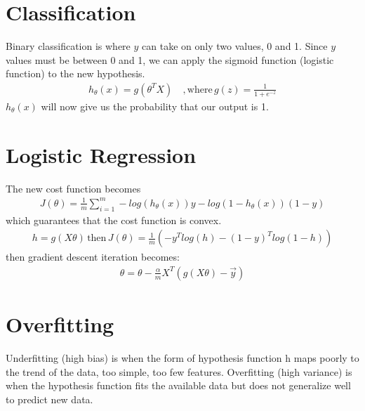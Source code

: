 \documentclass[12pt]{article}
\begin{document}
\section{Classification}
Binary classification is where $y$ can take on only two values, 0 and 1. Since $y$ values must be between 0 and 1, we can apply the sigmoid function (logistic function) to the new hypothesis.
\begin{align*}
    h_\theta (x)=g(\theta^TX)\ & ,\text{where}\, g(z) = \frac{1}{1+e^{-z}}
\end{align*}
$h_\theta (x)$ will now give us the probability that our output is 1.

\section{Logistic Regression}
The new cost function becomes 
\begin{align*}
	J(\theta)=\frac{1}{m}\sum_{i=1}^{m}-log(h_\theta (x))y-log(1-h_\theta (x))(1-y)
\end{align*}
which guarantees that the cost function is convex.
\begin{align*}
	h = g(X\theta) \,\text{then}\, J(\theta)=\frac{1}{m}(-y^Tlog(h)-(1-y)^Tlog(1-h))
\end{align*}
then gradient descent iteration becomes:
\begin{align*}
	\theta = \theta - \frac{\alpha}{m}X^T(g(X\theta)-\overrightarrow{y})
\end{align*}

\section{Overfitting}
Underfitting (high bias) is when the form of hypothesis function h maps poorly to the trend of the data, too simple, too few features. Overfitting (high variance) is when the hypothesis function fits the available data but does not generalize well to predict new data.
\end{document}

